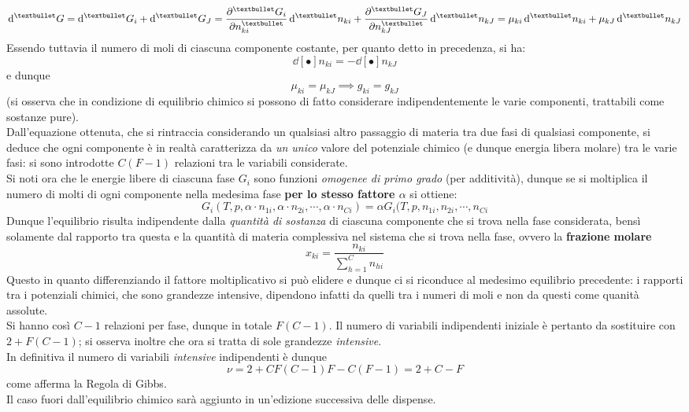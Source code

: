 \documentclass[10pt, oneside]{book}
\begin{document}
\[\dd[•]{G} = \dd[•]{G_i} + \dd[•]{G_J} = \pdv[•]{G_i}{n_{ki}}\dd[•]{n_{ki}} + \pdv[•]{G_J}{n_{kJ}}\dd[•]{n_{kJ}} = \mu_{ki} \dd[•]{n_{ki}} + \mu_{kJ} \dd[•]{n_{kJ}}\]
Essendo tuttavia il numero di moli di ciascuna componente costante, per quanto detto in precedenza, si ha:
\[\dd[•]{n_{ki}} = - \dd[•]{n_{kJ}}\]
e dunque 
\[\mu_{ki} = \mu_{kJ} \implies g_{ki} = g_{kJ}\]
(si osserva che in condizione di equilibrio chimico si possono di fatto considerare indipendentemente le varie componenti, trattabili come sostanze pure).\\
Dall'equazione ottenuta, che si rintraccia considerando un qualsiasi altro passaggio di materia tra due fasi di qualsiasi componente, si deduce che ogni componente è in realtà caratterizza da \textit{un unico} valore del potenziale chimico (e dunque energia libera molare) tra le varie fasi: si sono introdotte $C (F-1)$ relazioni tra le variabili considerate.\\
Si noti ora che le energie libere di ciascuna fase $G_i$ sono funzioni \textit{omogenee di primo grado} (per additività), dunque se si moltiplica il numero di molti di ogni componente nella medesima fase \textbf{per lo stesso fattore $\alpha$} si ottiene:
\[G_i (T,p, \alpha \cdot n_{1i}, \alpha \cdot n_{2i}, \cdots , \alpha \cdot n_{Ci}) = \alpha G_i (T, p, n_{1i}, n_{2i}, \cdots , n_{Ci}\]
Dunque l'equilibrio risulta indipendente dalla \textit{quantità di sostanza} di ciascuna componente che si trova nella fase considerata, bensì solamente dal rapporto tra questa e la quantità di materia complessiva nel sistema che si trova nella fase, ovvero la \textbf{frazione molare}
\[x_{ki} = \frac{n_{ki}}{\sum_{h=1}^C n_{hi}}\]
Questo in quanto differenziando il fattore moltiplicativo si può elidere e dunque ci si riconduce al medesimo equilibrio precedente: i rapporti tra i potenziali chimici, che sono grandezze intensive, dipendono infatti da quelli tra i numeri di moli e non da questi come quanità assolute.\\
Si hanno così $C-1$ relazioni per fase, dunque in totale $F(C-1)$. Il numero di variabili indipendenti iniziale è pertanto da sostituire con $2 + F(C-1)$; si osserva inoltre che ora si tratta di sole grandezze \textit{intensive}.\\
In definitiva il numero di variabili \textit{intensive} indipendenti è dunque
\[\nu = 2 + CF (C-1)F - C(F-1) = 2 + C - F\]
come afferma la Regola di Gibbs.\\
Il caso fuori dall'equilibrio chimico sarà aggiunto in un'edizione successiva delle dispense.
\end{document}
